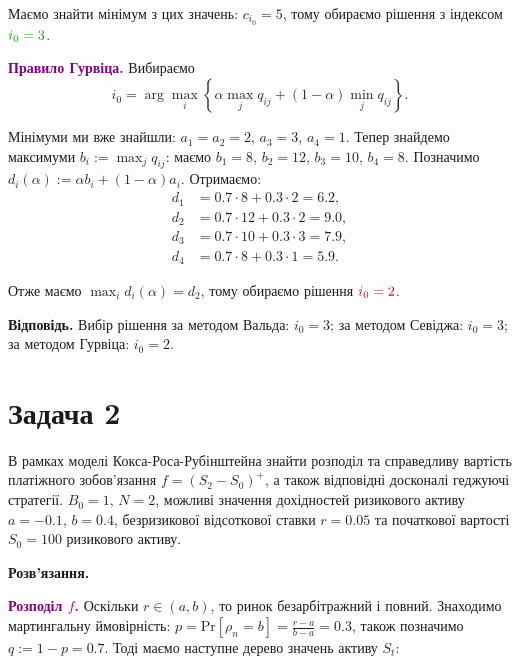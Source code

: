 \documentclass{test_template}
\begin{document}
Маємо знайти мінімум з цих значень: $c_{i_0} = 5$, тому обираємо рішення з
індексом $\textcolor{green!60!black}{i_0=3}$.


\textcolor{purple}{\textbf{Правило Гурвіца.}} Вибираємо
\begin{equation*}
    i_0 = \arg\max_i \left\{ \alpha \max_j q_{ij} + (1-\alpha)\min_j q_{ij} \right\}.
\end{equation*}

Мінімуми ми вже знайшли: $a_1=a_2=2$, $a_3=3$, $a_4=1$. Тепер знайдемо максимуми
$b_i := \max_j q_{ij}$: маємо $b_1=8$, $b_2=12$, $b_3=10$, $b_4=8$. Позначимо
$d_i(\alpha) := \alpha b_i + (1-\alpha)a_i$. Отримаємо:
\begin{align*}
    d_1 &= 0.7 \cdot 8 + 0.3 \cdot 2 = 6.2, \\
    d_2 &= 0.7 \cdot 12 + 0.3 \cdot 2 = 9.0, \\
    d_3 &= 0.7 \cdot 10 + 0.3 \cdot 3 = 7.9, \\
    d_4 &= 0.7 \cdot 8 + 0.3 \cdot 1 = 5.9.
\end{align*}

Отже маємо $\max_i d_{i}(\alpha) = d_{2}$, тому обираємо рішення
$\textcolor{purple}{i_0=2}$.

\textbf{Відповідь.} Вибір рішення за методом Вальда: $i_0=3$; за методом Севіджа:
$i_0=3$; за методом Гурвіца: $i_0=2$.

\newpage

\section{Задача 2}

\begin{problem}
   В рамках моделі Кокса-Роса-Рубінштейна знайти розподіл та справедливу
вартість платіжного зобов’язання $f=(S_2-S_0)^+$, а також відповідні досконалі
геджуючі стратегії. $B_0=1$, $N=2$, можливі значення дохідностей
ризикового активу $a=-0.1$, $b=0.4$, безризикової відсоткової ставки $r=0.05$ та
початкової вартості $S_0=100$ ризикового активу.
\end{problem}

\textbf{Розв'язання.} 

\textcolor{purple}{\textbf{Розподіл $f$.}} Оскільки $r \in (a,b)$, то ринок безарбітражний і повний.
Знаходимо мартингальну ймовірність: $p = \text{Pr}[\rho_n=b] = \frac{r-a}{b-a} =
0.3$, також позначимо $q := 1-p = 0.7$. Тоді маємо наступне дерево значень
активу $S_t$:
\end{document}
